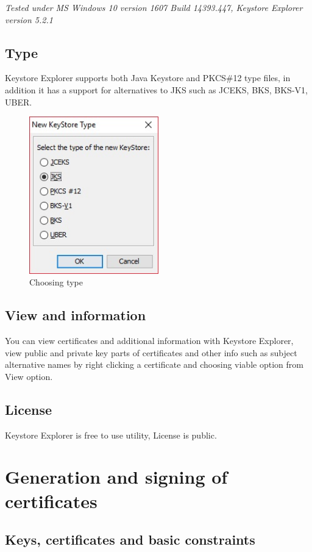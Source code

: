 \documentclass[10pt, a4paper]{report}
\begin{document}
\textit{Tested under MS Windows 10 version 1607 Build 14393.447, Keystore Explorer version 5.2.1}

  \subsection{Type}
Keystore Explorer supports both Java Keystore and PKCS\#12 type files, in addition it has a support for alternatives to JKS such as JCEKS, BKS, BKS-V1, UBER.
\begin{figure}[!ht]
 \caption{Choosing type}
 \centering
  \includegraphics[width=0.5\textwidth]{../Dependancies/Keystore_Explorer/Type.jpg}
\end{figure}
  
\subsection{View and information}
You can view certificates and additional information with Keystore Explorer, view public and private key parts of certificates and other info such as subject alternative names by right clicking a certificate and choosing viable option from View option.

  \subsection{License}
Keystore Explorer is free to use utility, License is public.
  
\section{Generation and signing of certificates}

  \subsection{Keys, certificates and basic constraints}
  
\end{document}
